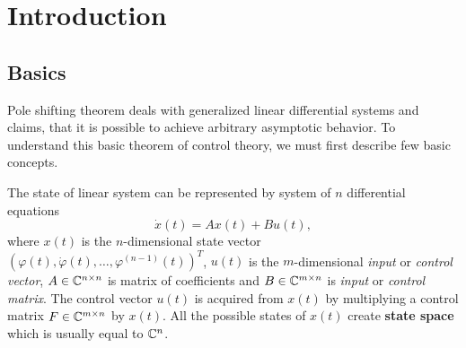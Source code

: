 \chapter{Introduction}
\label{chap:intr}

\section{Basics}
\label{sec:basics}

Pole shifting theorem deals with generalized linear differential systems and claims, that it is possible to achieve arbitrary asymptotic behavior. To understand this basic theorem of control theory, we must first describe few basic concepts.

The state of linear system can be represented by system of $n$ differential equations $$\dot{x}(t)=Ax(t)+Bu(t),$$ where $x(t)$ is the $n$-dimensional state vector $(\varphi(t),\dot{\varphi}(t),\ldots,\varphi^{(n-1)}(t))^T$, $u(t)$ is the $m$-dimensional \textit{input} or \textit{control vector}, $A \in \mathbb{C} ^{n\times n}$ is matrix of coefficients and $B\in \mathbb{C} ^{m\times n}$ is \textit{input} or \textit{control matrix}. The control vector $u(t)$ is acquired from $x(t)$ by multiplying a control matrix $F\in \mathbb{C} ^{m\times n}$ by $x(t)$. All the possible states of $x(t)$ create \textbf{state space} which is usually equal to $\mathbb{C}^n$. 

